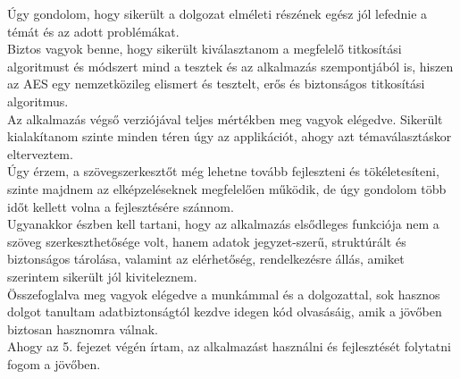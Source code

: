 
Úgy gondolom, hogy sikerült a dolgozat elméleti részének egész jól lefednie a témát és az adott problémákat.
\vspace{5pt} \\  Biztos vagyok benne, hogy sikerült kiválasztanom a megfelelő titkosítási algoritmust és módszert mind a tesztek és az alkalmazás szempontjából is, hiszen az AES egy nemzetközileg elismert és tesztelt, erős és biztonságos titkosítási algoritmus.
\vspace{5pt}\\ Az alkalmazás végső verziójával teljes mértékben meg vagyok elégedve. Sikerült kialakítanom szinte minden téren úgy az applikációt, ahogy azt témaválasztáskor elterveztem.
\vspace{5pt} \\ Úgy érzem, a szövegszerkesztőt még lehetne  tovább fejleszteni és tökéletesíteni, szinte majdnem az elképzeléseknek megfelelően működik, de úgy gondolom több időt kellett volna a fejlesztésére szánnom. \\Ugyanakkor észben kell tartani, hogy az alkalmazás elsődleges funkciója nem a szöveg szerkeszthetősége volt, hanem adatok jegyzet-szerű, struktúrált és biztonságos tárolása, valamint az elérhetőség, rendelkezésre állás, amiket szerintem sikerült jól kiviteleznem.
\vspace{5pt}\\ Összefoglalva meg vagyok elégedve a munkámmal és a dolgozattal, sok hasznos dolgot tanultam adatbiztonságtól kezdve idegen kód olvasásáig, amik a jövőben biztosan hasznomra válnak.
\vspace{5pt}\\ Ahogy az 5. fejezet végén írtam, az alkalmazást használni és fejlesztését folytatni fogom a jövőben. 